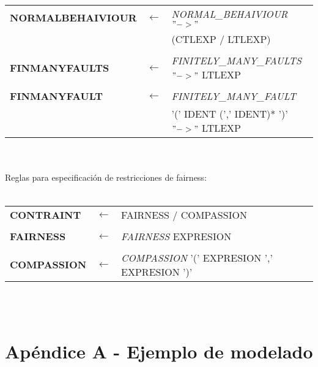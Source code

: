\documentclass[titlepage, 12pt]{book}
\begin{document}
\noindent \begin{tabular}{>{\bfseries}lll}
NORMALBEHAIVIOUR & $\longleftarrow$ & \textit{NORMAL\_BEHAIVIOUR} $"->"$ \\
			     & & (CTLEXP / LTLEXP)\\\\
FINMANYFAULTS & $\longleftarrow$ & \textit{FINITELY\_MANY\_FAULTS} $"->"$ LTLEXP\\\\
FINMANYFAULT & $\longleftarrow$ & \textit{FINITELY\_MANY\_FAULT} \\ 
			 & & '(' IDENT (',' IDENT)* ')' $"->"$ LTLEXP\\
\end{tabular}
~\\\\

Reglas para especificaci\'on de restricciones de fairness:\\\\

\noindent \begin{tabular}{>{\bfseries}lll}
CONTRAINT & $\longleftarrow$ & FAIRNESS / COMPASSION\\\\
FAIRNESS & $\longleftarrow$ & \textit{FAIRNESS} EXPRESION\\\\
COMPASSION & $\longleftarrow$ & \textit{COMPASSION} '(' EXPRESION ',' EXPRESION ')'\\
\end{tabular}
~\\\\



\chapter{Ap\'endice A - Ejemplo de modelado}
\label{ejemploModelado}
\end{document}
